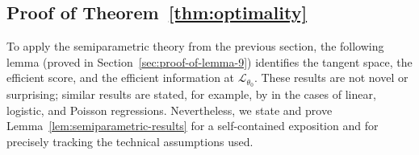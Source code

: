 \documentclass[aos]{imsart}
\theoremstyle{definition}
\theoremstyle{remark}
\newcommand{\law}{\mathcal L}							%
\begin{document}
\subsection{Proof of Theorem~\ref{thm:optimality}}  \label{sec:optimality-proof}

To apply the semiparametric theory from the previous section, the following lemma (proved in Section~\ref{sec:proof-of-lemma-9}) identifies the tangent space, the efficient score, and the efficient information at $\law_{\theta_0}$. These results are not novel or surprising; similar results are stated, for example, by \citet{Robins2001} in the cases of linear, logistic, and Poisson regressions. Nevertheless, we state and prove Lemma~\ref{lem:semiparametric-results} for a self-contained exposition and for precisely tracking the technical assumptions used. 
\end{document}
